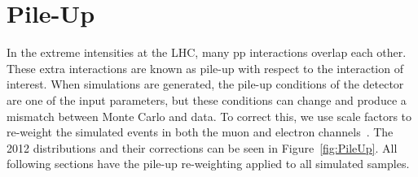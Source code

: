 

\section{Pile-Up}


In the extreme intensities at the LHC, many pp interactions overlap each other.  These extra interactions are known as pile-up with respect to the interaction of interest. When simulations are generated, the pile-up conditions of the detector are one of the input parameters, but these conditions can change and produce a mismatch between Monte Carlo and data.  To correct this, we use scale factors to re-weight the simulated events in both the muon and electron channels~\cite{cms_lumi_plots}.  The 2012 distributions and their corrections can be seen in Figure~\ref{fig:PileUp}. All following sections have the pile-up re-weighting applied to all simulated samples.  

